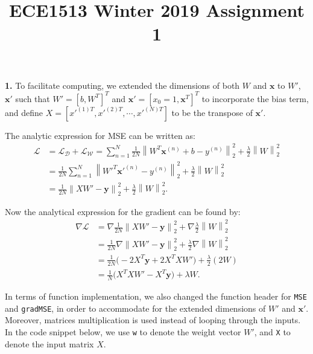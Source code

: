 \documentclass[12pt]{article}
\newcommand{\LL}{\mathcal{L}}
\newcommand{\LD}{\mathcal{L}_\mathcal{D}}
\newcommand{\LW}{\mathcal{L}_\mathcal{W}}
\newcommand{\norm}[1]{\left\lVert#1\right\rVert}
\newenvironment{problem}[2][Problem]{\begin{trivlist}
\item[\hskip \labelsep {\bfseries #1}\hskip \labelsep {\bfseries #2.}]}{\end{trivlist}}
\begin{document}
 
\title{ECE1513 Winter 2019 Assignment 1}
\maketitle

\begin{problem}{1}

\textbf{1.}
To facilitate computing, we extended the dimensions of both $W$ and $\mathbf{x}$ to $W'$, $\mathbf{x}'$
such that $W' = [b, W^T]^T$ and $\mathbf{x}' = [x_0 = 1, \mathbf{x}^T]^T$ to incorporate the bias term, and define
$X = [x'^{(1)T}, x'^{(2)T}, \cdots, x'^{(N)T}]$ to be the transpose of $\mathbf{x}'$.

The analytic expression for MSE can be written as:
\begin{align*}
\LL &= \LD + \LW = \sum_{n=1}^N \frac{1}{2N}\norm{W^T \mathbf{x}^{(n)} + b - y^{(n)}}_2^2 + \frac{\lambda}{2}\norm{W}_2^2\\
&= \frac{1}{2N} \sum_{n=1}^N \norm{W'^T \mathbf{x'}^{(n)} - y^{(n)}}_2^2 + \frac{\lambda}{2}\norm{W}_2^2\\
&= \frac{1}{2N} \norm{XW' - \mathbf{y}}_2^2 + \frac{\lambda}{2}\norm{W}_2^2.
\end{align*}

Now the analytical expression for the gradient can be found by:
\begin{align*}
\nabla \LL &= \nabla \frac{1}{2N} \norm{XW' - \mathbf{y}}_2^2 + \nabla \frac{\lambda}{2}\norm{W}_2^2 \\
&= \frac{1}{2N} \nabla \norm{XW' - \mathbf{y}}_2^2 + \frac{\lambda}{2} \nabla \norm{W}_2^2 \\
&= \frac{1}{2N}\big(-2 X^T\mathbf{y} + 2X^TXW'\big) + \frac{\lambda}{2}(2W) \\
&= \frac{1}{N}\big(X^TXW' - X^T\mathbf{y}\big) + \lambda W.
\end{align*}

In terms of function implementation, we also changed the function header for \texttt{MSE} and \texttt{gradMSE}, in order to accommodate for the extended dimensions of $W'$ and $\textbf{x}'$. 
Moreover, matrices multiplication is used instead of looping through the inputs. 
In the code snippet below, we use \texttt{w} to denote the weight vector $W'$, and \texttt{X} to denote
the input matrix $X$.


\end{problem}
\end{document}
